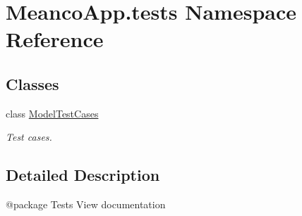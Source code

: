 \hypertarget{namespace_meanco_app_1_1tests}{}\section{Meanco\+App.\+tests Namespace Reference}
\label{namespace_meanco_app_1_1tests}
\subsection*{Classes}
\begin{DoxyCompactItemize}
\item 
class \hyperlink{class_meanco_app_1_1tests_1_1_model_test_cases}{Model\+Test\+Cases}
\begin{DoxyCompactList}\small\item\em Test cases. \end{DoxyCompactList}\end{DoxyCompactItemize}


\subsection{Detailed Description}
\begin{DoxyVerb}@package Tests
View documentation\end{DoxyVerb}
 